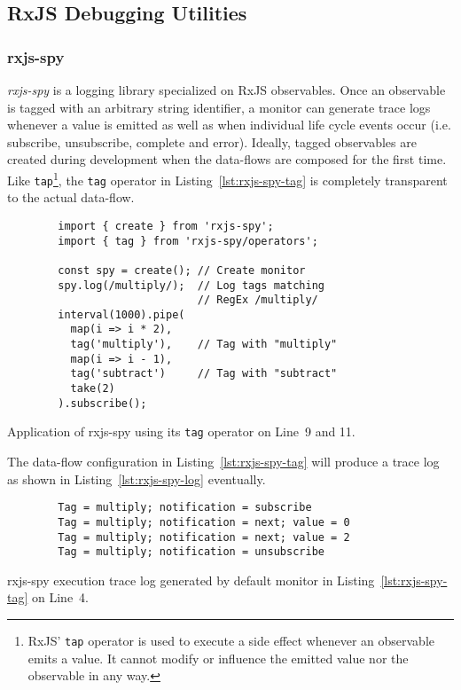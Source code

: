 \documentclass[sigplan,screen]{acmart}
\begin{document}
\subsection{RxJS Debugging Utilities}
\label{sec:rxjs-debugging-utilities}

\subsubsection{rxjs-spy}

\emph{rxjs-spy}\cite{rxjsspy} is a logging library specialized on RxJS observables. Once an observable is tagged with an arbitrary string identifier, a monitor can generate trace logs whenever a value is emitted as well as when individual life cycle events occur (i.e. subscribe, unsubscribe, complete and error). Ideally, tagged observables are created during development when the data-flows are composed for the first time. Like \texttt{tap}\footnote{RxJS' \texttt{tap} operator is used to execute a side effect whenever an observable emits a value. It cannot modify or influence the emitted value nor the observable in any way.}, the \texttt{tag} operator in Listing~\ref{lst:rxjs-spy-tag} is completely transparent to the actual data-flow.

\begin{listing}
	\begin{verbatim}
		import { create } from 'rxjs-spy';
		import { tag } from 'rxjs-spy/operators';

		const spy = create(); // Create monitor
		spy.log(/multiply/);  // Log tags matching
		                      // RegEx /multiply/
		interval(1000).pipe(
		  map(i => i * 2),
		  tag('multiply'),    // Tag with "multiply"
		  map(i => i - 1),
		  tag('subtract')     // Tag with "subtract"
		  take(2)
		).subscribe();
	\end{verbatim}
	\caption{Application of rxjs-spy using its \texttt{tag} operator on Line~9 and 11.}
	\label{lst:rxjs-spy-tag}
\end{listing}

The data-flow configuration in Listing~\ref{lst:rxjs-spy-tag} will produce a trace log as shown in Listing~\ref{lst:rxjs-spy-log} eventually.

\begin{listing}
	\begin{verbatim}
		Tag = multiply; notification = subscribe
		Tag = multiply; notification = next; value = 0
		Tag = multiply; notification = next; value = 2
		Tag = multiply; notification = unsubscribe
	\end{verbatim}
	\caption{rxjs-spy execution trace log generated by default monitor in Listing~\ref{lst:rxjs-spy-tag} on Line~4.}
	\label{lst:rxjs-spy-log}
\end{listing}
\end{document}
